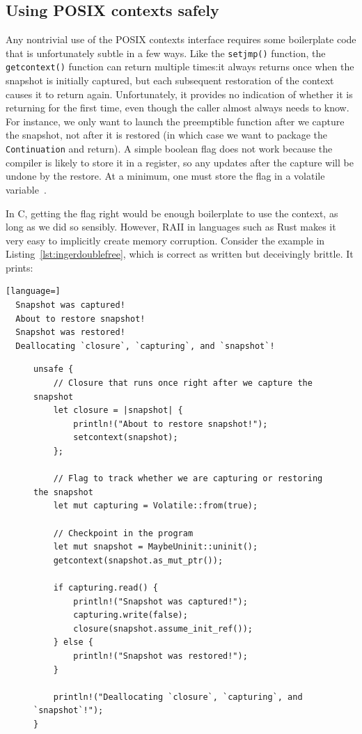 \subsection{Using POSIX contexts safely}
\label{sec:libinger:boilerplate}

Any nontrivial use of the POSIX contexts interface requires some boilerplate code
that is unfortunately subtle in a few ways.  Like the \texttt{setjmp()} function, the
\texttt{getcontext()} function can return multiple times:\@ it always returns once
when the snapshot is initially captured, but each subsequent restoration of the
context causes it to return again.  Unfortunately, it provides no indication of
whether it is returning for the first time, even though the caller almost always
needs to know.  For instance, we only want to launch the preemptible function after
we capture the snapshot, not after it is restored (in which case we want to package
the \texttt{Continuation} and return).  A simple boolean flag does not work because
the compiler is likely to store it in a register, so any updates after the capture
will be undone by the restore.  At a minimum, one must store the flag in a volatile
variable~\cite{getcontext-manpage}.

In C, getting the flag right would be enough boilerplate to use the context, as long
as we did so sensibly.  However, RAII in languages such as Rust makes it very easy to
implicitly create memory corruption.  Consider the example in
Listing~\ref{lst:ingerdoublefree}, which is correct as written but deceivingly
brittle.  It prints:
\begin{lstlisting}[language=]
  Snapshot was captured!
  About to restore snapshot!
  Snapshot was restored!
  Deallocating `closure`, `capturing`, and `snapshot`!
\end{lstlisting}

\begin{figure}
\begin{lstlisting}[label=lst:ingerdoublefree,caption=Subtly unsound use of POSIX contexts from Rust,morekeywords={let,mut,unsafe}]
unsafe {
	// Closure that runs once right after we capture the snapshot
	let closure = |snapshot| {
		println!("About to restore snapshot!");
		setcontext(snapshot);
	};

	// Flag to track whether we are capturing or restoring the snapshot
	let mut capturing = Volatile::from(true);

	// Checkpoint in the program
	let mut snapshot = MaybeUninit::uninit();
	getcontext(snapshot.as_mut_ptr());

	if capturing.read() {
		println!("Snapshot was captured!");
		capturing.write(false);
		closure(snapshot.assume_init_ref());
	} else {
		println!("Snapshot was restored!");
	}

	println!("Deallocating `closure`, `capturing`, and `snapshot`!");
}
\end{lstlisting}
\end{figure}

